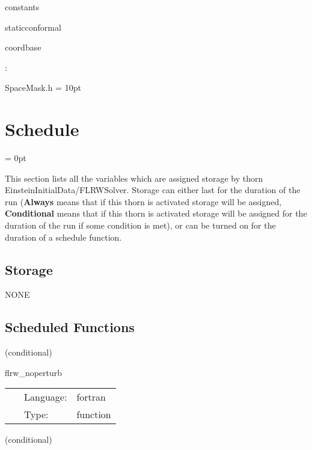 constants

staticconformal

coordbase
\vspace{2mm}

\vspace{5mm}

: 

SpaceMask.h
\vspace{2mm}\parskip = 10pt 

\section{Schedule} 


\parskip = 0pt


\noindent This section lists all the variables which are assigned storage by thorn EinsteinInitialData/FLRWSolver.  Storage can either last for the duration of the run ({\bf Always} means that if this thorn is activated storage will be assigned, {\bf Conditional} means that if this thorn is activated storage will be assigned for the duration of the run if some condition is met), or can be turned on for the duration of a schedule function.


\subsection*{Storage}NONE
\subsection*{Scheduled Functions}
\vspace{5mm}

   (conditional) 

\hspace{5mm} flrw\_noperturb 

\hspace{5mm}{\it sets up initial data for flrw spacetime } 


\hspace{5mm}

 \begin{tabular*}{160mm}{cll} 
~ & Language:  & fortran \\ 
~ & Type:  & function \\ 
\end{tabular*} 


\vspace{5mm}

   (conditional) 

